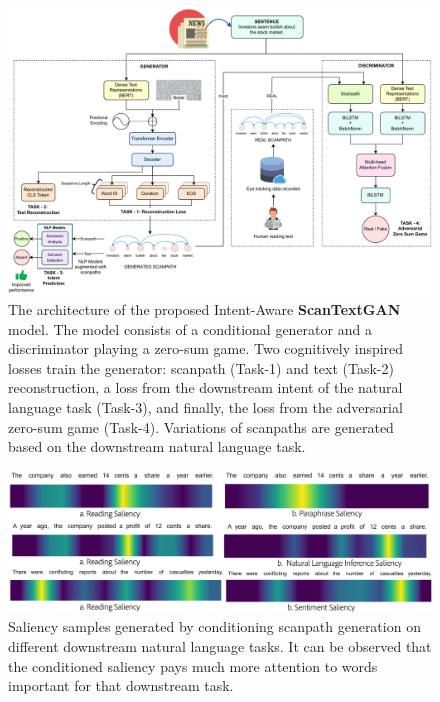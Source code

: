 \begin{landscape}
\begin{figure}
    \centering
    \includegraphics[width=1.2\textwidth]{images/Intent_Scanpath_Figure.pdf}
    \caption{The architecture of the proposed Intent-Aware \textbf{ScanTextGAN} model. The model consists of a conditional generator and a discriminator playing a zero-sum game. Two cognitively inspired losses train the generator: scanpath (Task-1) and text (Task-2) reconstruction, a loss from the downstream intent of the natural language task (Task-3), and finally, the loss from the adversarial zero-sum game (Task-4). Variations of scanpaths are generated based on the downstream natural language task.}
    \label{fig:intent-model} 
\end{figure}
\end{landscape}


\begin{figure}[]
    \centering
    \includegraphics[width=\textwidth]{images/intent-scantextgan-saliency.pdf}
    \caption{Saliency samples generated by conditioning scanpath generation on different downstream natural language tasks. It can be observed that the conditioned saliency pays much more attention to words important for that downstream task.}
    \label{fig:intent-saliency-example} 
\end{figure}









